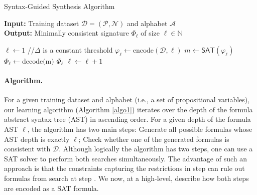 %
\begin{algorithm}
\caption{\pltl Syntax-Guided Synthesis Algorithm}\label{algo1}
\hspace*{\algorithmicindent} \textbf{Input: }{Training dataset $\mathcal{D=(P,N)}$
and alphabet $\mathcal{A}$}\\
\hspace*{\algorithmicindent} \textbf{Output: }{Minimally consistent signature $\Phi_\ell$ of size $\ell\in\mathbb{N}$}
\begin{algorithmic}[1]
%
\State $\ell \gets \text{1}$ %
%
%
\While{$\ell \leq \Delta$} //$\Delta$ is a constant threshold
\State $\varphi_\ell \gets \text{encode}(\mathcal{D}, \ell)$%
\State $m \gets \textsf{SAT}(\varphi_{\ell})$
    \State $\Phi_{\ell} \gets \text{decode(m)}$ %
    \State \Return $\Phi_\ell$
\Else
    \State $\ell \gets \ell +1$ %
\EndIf
\EndWhile
\end{algorithmic}
\end{algorithm}
%
\paragraph{Algorithm.}
For a given training dataset  and alphabet  (i.e., a set of
propositional variables), our learning algorithm (Algorithm \ref{algo1})
iterates over the depth of the \pltl formula
abstract syntax tree (AST) in ascending order.
For a given depth of the formula AST $\ell$,
the algorithm has two main steps:  Generate all possible \pltl formulas
whose AST depth is exactly $\ell$;  Check whether one of the generated
formulas is consistent with $\mathcal{D}$. Although logically the algorithm has two steps,
one can use a SAT solver to perform both searches simultaneously.
The advantage of such an approach is that the constraints capturing the
restrictions in step  can rule out formulas from search at step
. We now, at a high-level, describe
how both steps are encoded as a SAT formula.

